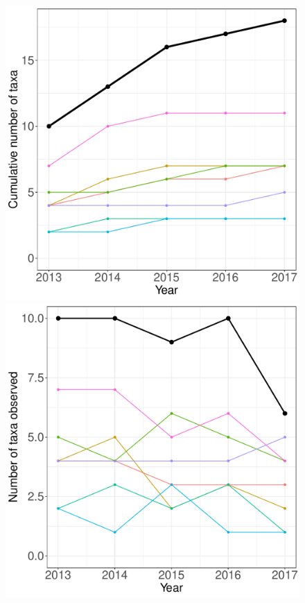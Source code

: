 \documentclass[11pt, oneside]{article}
\begin{document}
\begin{figure}[h!]
\centering
\includegraphics[scale = 0.4]{cap-herps-banville_species_accumulation_curve.pdf}
\includegraphics[scale = 0.4]{cap-herps-banville_num_taxa_over_time.pdf}

\end{figure}
\end{document}
